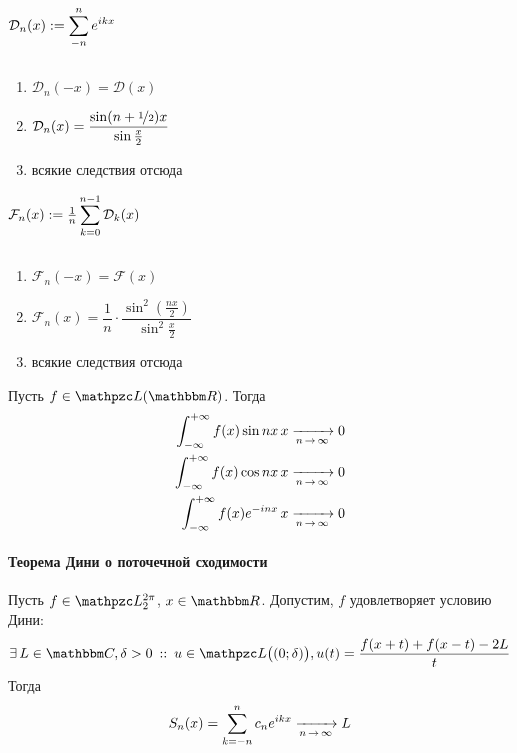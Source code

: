\documentclass[12pt,draft,timbord]{longnotes}
\begin{document}
\begin{defn}\label{defn:fourier::dirker::dir}
  $\mathcal D_n(x) := \displaystyle\sum_{-n}^n e^{ikx}$
\end{defn}
\begin{lem}\label{lem:fourier::dirker::dir}
  ${}$
  \begin{enumerate}
    \item $\mathcal D_n(-x) = \mathcal D(x)$
    \item $\mathcal D_n(x) = \dfrac{\sin(n+\nicefrac{1}{2})x}{\sin \frac x 2}$
    \item всякие следствия отсюда
  \end{enumerate}
\end{lem}
\begin{defn}\label{defn:fourier::dirker::fey}
  $\mathcal F_n(x) := \frac{1}{n} \displaystyle\sum_{k=0}^{n-1} \mathcal D_k(x)$
\end{defn}
\begin{lem}\label{lem:fourier::dirker::fey}
  ${}$
  \begin{enumerate}
    \item $\mathcal F_n(-x) = \mathcal F(x)$
    \item $\mathcal F_n(x)= \dfrac1 n \cdot\dfrac{\sin^2\left(\frac{nx}{2}\right)}{\sin^2\frac x 2}$
    \item всякие следствия отсюда
  \end{enumerate}
\end{lem}

\begin{lem}\label{lem:fourier::dirker::rimleb}
  Пусть $f\in \summb(\R)$. Тогда
  \begin{align*}
    \intR f(x) \sin nx \, x &\xto{n\to \infty} 0 \\
    \intR f(x) \cos nx \, x &\xto{n\to \infty} 0\\
    \intR f(x) e^{-inx} \, x &\xto{n\to \infty} 0\\
  \end{align*}
\end{lem}


\paragraph{Теорема Дини о поточечной сходимости}
\label{par:fourier::dini}

\begin{thrm}[Дини]\label{thrm:fourier::dini}
  Пусть $f\in \summb_2^{2\pi}$, $x\in\R$. Допустим, $f$ удовлетворяет условию Дини:
  \[
    \exists\, L \in \C, \delta > 0 \that u \in \summb\bigl((0;\delta)\bigr), 
    u(t) = \frac{f(x+t) + f(x-t) - 2L}{t}
  \]
  Тогда 
  \[
    S_n(x) = \sum_{k=-n}^{n} c_n e^{ikx} \xto{n \to \infty} L
  \]
\end{thrm}
\end{document}
